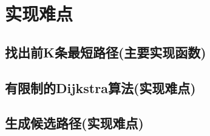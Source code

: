 \section{实现难点}
   
    \subsection{找出前K条最短路径(主要实现函数)}
        

\newpage

    \subsection{有限制的Dijkstra算法(实现难点)}
        

\newpage
    
    \subsection{生成候选路径(实现难点)}
        